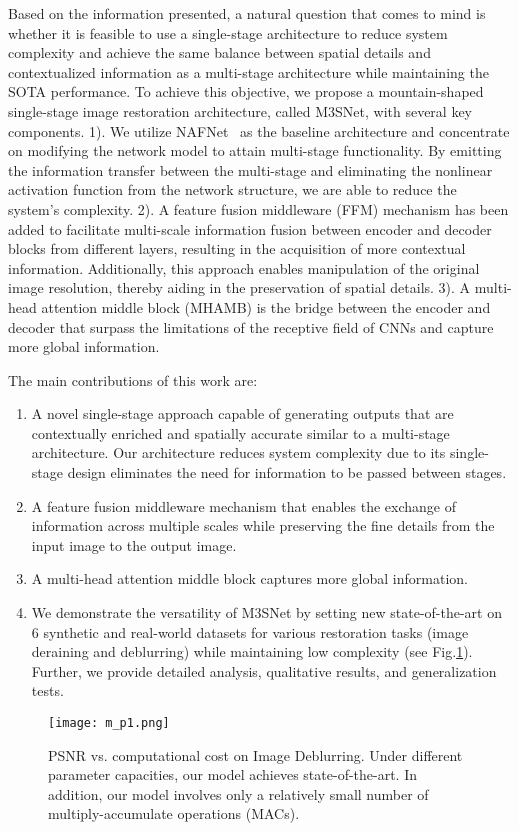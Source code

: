 \documentclass[sn-mathphys,Numbered]{sn-jnl}
\theoremstyle{thmstyleone}\newtheorem{theorem}{Theorem}\newtheorem{proposition}[theorem]{Proposition}
\theoremstyle{thmstyletwo}\newtheorem{example}{Example}\newtheorem{remark}{Remark}
\theoremstyle{thmstylethree}\newtheorem{definition}{Definition}
\begin{document}
Based on the information presented, a natural question that comes to mind is whether it is feasible to use a single-stage architecture to reduce system complexity and  achieve the same balance between spatial details and contextualized information as a multi-stage architecture while  maintaining the SOTA performance. To achieve this objective, we propose a mountain-shaped single-stage image restoration architecture, called M3SNet, with several key components. 1). We utilize NAFNet~\cite{chen2022simple} as the baseline architecture and concentrate on modifying the network model to attain multi-stage functionality. By emitting the information transfer between the multi-stage and eliminating the nonlinear activation function from the network structure, we are able to reduce the system's complexity. 2). A feature fusion middleware (FFM) mechanism has been added to facilitate multi-scale information fusion between encoder and decoder blocks from different layers, resulting in the acquisition of more contextual information. Additionally, this approach enables manipulation of the original image resolution, thereby aiding in the preservation of spatial details.
3). A multi-head attention middle block (MHAMB) is the bridge between the encoder and decoder that  surpass the limitations of the receptive field of CNNs and capture more global information.

The main contributions of this work are:
\begin{enumerate}
\item A novel single-stage approach capable of generating outputs that are contextually enriched and spatially accurate similar to a multi-stage architecture. Our architecture reduces system complexity due to its single-stage design eliminates the need for information to be passed between stages.
\item A feature fusion middleware mechanism that enables the exchange of information across multiple scales while preserving the fine details from the input image to the output image.
\item A multi-head attention middle block captures more global information. 
\item We demonstrate the versatility of M3SNet by setting new state-of-the-art on 6 synthetic and real-world datasets for various restoration tasks (image deraining and deblurring) while maintaining low complexity (see Fig.\ref{fig:01}). Further, we provide detailed analysis, qualitative results, and generalization tests.
\end {enumerate}
\begin{figure}[t] \centering
	\texttt{[image: m\_p1.png]}
	\caption{PSNR vs. computational cost on Image Deblurring. Under different parameter capacities, our model achieves state-of-the-art. In addition, our model involves only a relatively small number of multiply-accumulate operations (MACs).}
	\label{fig:01}
\end{figure}
\end{document}
